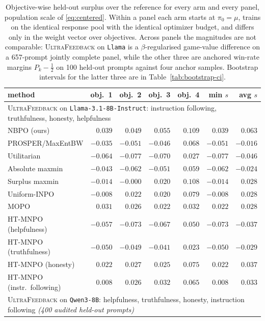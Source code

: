 \documentclass{article}
\theoremstyle{remark}
\theoremstyle{plain}
\newcommand{\NBPO}{\textsc{NBPO}}
\begin{document}
\begin{table}[t]
\centering\scriptsize
\setlength{\tabcolsep}{3.2pt}
\caption{Objective-wise held-out surplus over the reference for every arm and every panel, population
scale of \eqref{eq:centered}. Within a panel each arm starts at $\pi_0=\mu$, trains on the identical
response pool with the identical optimizer budget, and differs only in the weight vector over objectives.
Across panels the magnitudes are not comparable: \textsc{UltraFeedback} on \texttt{Llama} is a $\beta$-regularised game-value difference on a 657-prompt jointly complete panel, while the other three are anchored win-rate margins $P_k-\tfrac12$ on 100 held-out prompts against four anchor samples. Bootstrap intervals for the latter three are in Table~\ref{tab:bootstrap-ci}.}
\label{tab:objectivewise-appendix}
\begin{tabular}{lrrrrrr}
\toprule
method & obj.\ 1 & obj.\ 2 & obj.\ 3 & obj.\ 4 & min $s$ & avg $s$\\
\midrule
\multicolumn{7}{l}{\textsc{UltraFeedback} on \texttt{Llama-3.1-8B-Instruct}: instruction following, truthfulness, honesty, helpfulness}\\
\NBPO{} (ours) & $0.039$ & $0.049$ & $0.055$ & $0.109$ & $0.039$ & $0.063$\\
PROSPER/MaxEntBW & $-0.035$ & $-0.051$ & $-0.046$ & $0.068$ & $-0.051$ & $-0.016$\\
Utilitarian & $-0.064$ & $-0.077$ & $-0.070$ & $0.027$ & $-0.077$ & $-0.046$\\
Absolute maxmin & $-0.043$ & $-0.062$ & $-0.051$ & $0.059$ & $-0.062$ & $-0.024$\\
Surplus maxmin & $-0.014$ & $-0.000$ & $0.020$ & $0.108$ & $-0.014$ & $0.028$\\
Uniform-INPO & $-0.008$ & $0.022$ & $0.020$ & $0.079$ & $-0.008$ & $0.028$\\
MOPO & $0.031$ & $0.026$ & $0.022$ & $0.032$ & $0.022$ & $0.028$\\
HT-MNPO (helpfulness) & $-0.057$ & $-0.073$ & $-0.067$ & $0.050$ & $-0.073$ & $-0.037$\\
HT-MNPO (truthfulness) & $-0.050$ & $-0.049$ & $-0.041$ & $0.023$ & $-0.050$ & $-0.029$\\
HT-MNPO (honesty) & $0.022$ & $0.027$ & $0.025$ & $0.075$ & $0.022$ & $0.037$\\
HT-MNPO (instr.\ following) & $0.008$ & $0.026$ & $0.032$ & $0.065$ & $0.008$ & $0.033$\\
\midrule
\multicolumn{7}{l}{\textsc{UltraFeedback} on \texttt{Qwen3-8B}: helpfulness, truthfulness, honesty, instruction following \emph{(400 audited held-out prompts)}}\\

\end{tabular}
\end{table}
\end{document}
